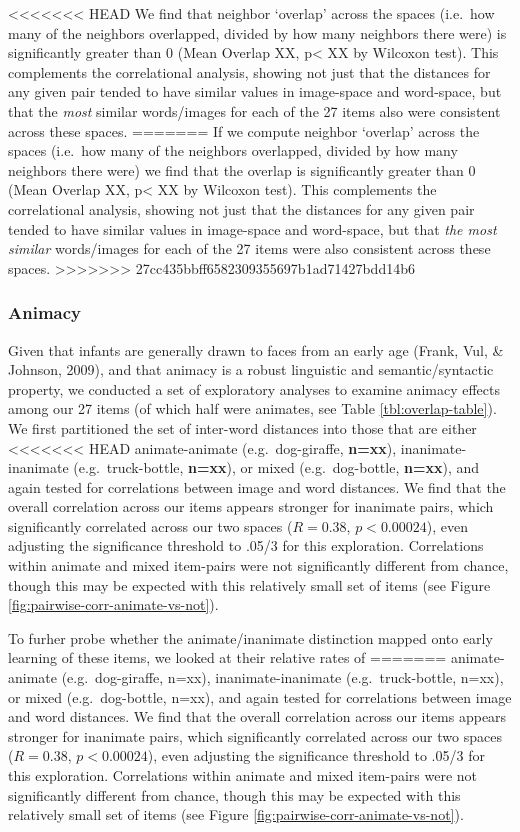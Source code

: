 \documentclass[10pt, letterpaper]{article}
\begin{document}
<<<<<<< HEAD
We find that neighbor `overlap' across the spaces (i.e.~how many of the
neighbors overlapped, divided by how many neighbors there were) is
significantly greater than 0 (Mean Overlap XX, p\textless{} XX by
Wilcoxon test). This complements the correlational analysis, showing not
just that the distances for any given pair tended to have similar values
in image-space and word-space, but that the \emph{most} similar
words/images for each of the 27 items also were consistent across these
spaces.
=======
If we compute neighbor `overlap' across the spaces (i.e.~how many of the
neighbors overlapped, divided by how many neighbors there were) we find
that the overlap is significantly greater than 0 (Mean Overlap XX,
p\textless{} XX by Wilcoxon test). This complements the correlational
analysis, showing not just that the distances for any given pair tended
to have similar values in image-space and word-space, but that
\textit{the most similar} words/images for each of the 27 items were
also consistent across these spaces.
>>>>>>> 27cc435bbff6582309355697b1ad71427bdd14b6

\subsubsection{Animacy}\label{animacy}

Given that infants are generally drawn to faces from an early age
(Frank, Vul, \& Johnson, 2009), and that animacy is a robust linguistic
and semantic/syntactic property, we conducted a set of exploratory
analyses to examine animacy effects among our 27 items (of which half
were animates, see Table \ref{tbl:overlap-table}). We first partitioned
the set of inter-word distances into those that are either
<<<<<<< HEAD
animate-animate (e.g.~dog-giraffe, \textbf{n=xx}), inanimate-inanimate
(e.g.~truck-bottle, \textbf{n=xx}), or mixed (e.g.~dog-bottle,
\textbf{n=xx}), and again tested for correlations between image and word
distances. We find that the overall correlation across our items appears
stronger for inanimate pairs, which significantly correlated across our
two spaces (\(R = 0.38\), \(p < 0.00024\)), even adjusting the
significance threshold to .05/3 for this exploration. Correlations
within animate and mixed item-pairs were not significantly different
from chance, though this may be expected with this relatively small set
of items (see Figure \ref{fig:pairwise-corr-animate-vs-not}).

To furher probe whether the animate/inanimate distinction mapped onto
early learning of these items, we looked at their relative rates of
=======
animate-animate (e.g.~dog-giraffe, n=xx), inanimate-inanimate
(e.g.~truck-bottle, n=xx), or mixed (e.g.~dog-bottle, n=xx), and again
tested for correlations between image and word distances. We find that
the overall correlation across our items appears stronger for inanimate
pairs, which significantly correlated across our two spaces
(\(R = 0.38\), \(p < 0.00024\)), even adjusting the significance
threshold to .05/3 for this exploration. Correlations within animate and
mixed item-pairs were not significantly different from chance, though
this may be expected with this relatively small set of items (see Figure
\ref{fig:pairwise-corr-animate-vs-not}).
\end{document}
